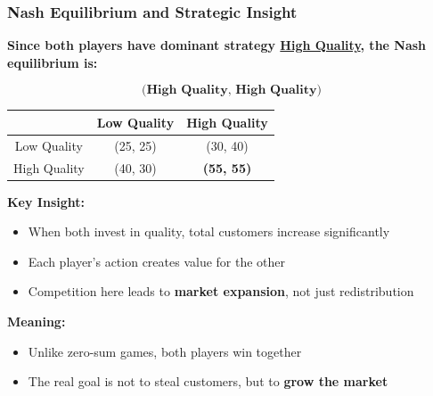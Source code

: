 \begin{frame}[fragile]\frametitle{Nash Equilibrium and Strategic Insight}

\textbf{Since both players have dominant strategy \underline{High Quality}, the Nash equilibrium is:}

\[
\textbf{(High\ Quality,\ High\ Quality)}
\]

\vspace{6pt}

\begin{center}
\begin{tabular}{|c|c|c|}
  \hline
  & Low Quality & High Quality \\
  \hline
  Low Quality & (25, 25) & (30, 40) \\
  \hline
  High Quality & (40, 30) & \textbf{(55, 55)} \\
  \hline
\end{tabular}
\end{center}

\vspace{6pt}

\textbf{Key Insight:}

\begin{itemize}
  \item When both invest in quality, total customers increase significantly
  \item Each player's action creates value for the other
  \item Competition here leads to \textbf{market expansion}, not just redistribution
\end{itemize}

\vspace{6pt}

\textbf{Meaning:}
\begin{itemize}
  \item Unlike zero-sum games, both players win together
  \item The real goal is not to steal customers, but to \textbf{grow the market}
\end{itemize}

\end{frame}


